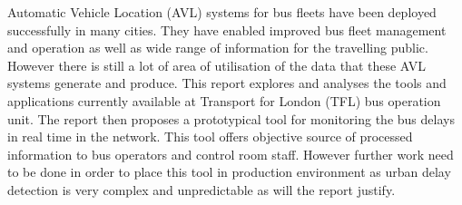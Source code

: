Automatic Vehicle Location (AVL) systems for bus fleets have been deployed successfully in many cities. They have enabled improved bus fleet management and operation as well as wide range of information for the travelling public. However there is still a lot of area of utilisation of the data that these AVL systems generate and produce. This report explores and analyses the tools and applications currently available at Transport for London (TFL) bus operation unit. The report then proposes a prototypical tool for monitoring the bus delays in real time in the network. This tool offers objective source of processed information to bus operators and control room staff. However further work need to be done in order to place this tool in production environment as urban delay detection is very complex and unpredictable as will the report justify.

